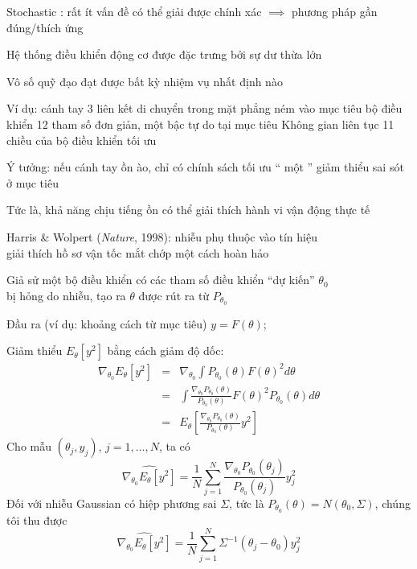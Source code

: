 \documentclass{article}
\begin{document}
\begin{huge}
Stochastic : rất ít vấn đề có thể giải được chính xác\al
$\implies$ phương pháp gần đúng/thích ứng





Hệ thống điều khiển động cơ được đặc trưng bởi sự dư thừa lớn

Vô số quỹ đạo đạt được bất kỳ nhiệm vụ nhất định nào

Ví dụ: cánh tay 3 liên kết di chuyển trong mặt phẳng ném vào mục tiêu\nl
  bộ điều khiển 12 tham số đơn giản, một bậc tự do tại mục tiêu\nl
  Không gian liên tục 11 chiều của bộ điều khiển tối ưu

Ý tưởng: nếu cánh tay ồn ào, chỉ có chính sách tối ưu `` một ''
giảm thiểu sai sót ở mục tiêu

Tức là, khả năng chịu tiếng ồn có thể giải thích hành vi vận động thực tế

Harris \& Wolpert ({\em Nature}, 1998): nhiễu phụ thuộc vào tín hiệu\\
giải thích hồ sơ vận tốc mắt chớp một cách hoàn hảo


Giả sử một bộ điều khiển có các tham số điều khiển ``dự kiến'' $\theta_0$\\
bị hỏng do nhiễu, tạo ra $\theta$ được rút ra từ $P_{\theta_0}$

Đầu ra (ví dụ: khoảng cách từ mục tiêu) $y = F(\theta)$; 


\maxfigwidth
{}



Giảm thiểu $E_{\theta}[y^2]$ bằng cách giảm độ dốc:
\begin{eqnarray*}
\nabla_{\theta_0} E_{\theta}[y^2]
  &=&  \nabla_{\theta_0} \int P_{\theta_0}(\theta)F(\theta)^2 d\theta \\
  &=&  \int \frac{\nabla_{\theta_0} P_{\theta_0}(\theta)}{P_{\theta_0}(\theta)}
            F(\theta)^2 P_{\theta_0}(\theta)d\theta \\
  &=&  E_{\theta}[\frac{\nabla_{\theta_0} P_{\theta_0}(\theta)}
                       {P_{\theta_0}(\theta)}
                  y^2]
\end{eqnarray*}
Cho mẫu $(\theta_j,y_j)$, $j=1,\ldots,N$, ta có
\[
  \hat{\nabla_{\theta_0} E_{\theta}[y^2]} =
  \frac{1}{N}\sum_{j=1}^N
     \frac{\nabla_{\theta_0} P_{\theta_0}(\theta_j)}
                       {P_{\theta_0}(\theta_j)}
                  y_j^2
\]
Đối với nhiễu Gaussian có hiệp phương sai $\Sigma$, tức là
$P_{\theta_0}(\theta) = N(\theta_0,\Sigma)$, chúng tôi thu được
\[
  \hat{\nabla_{\theta_0} E_{\theta}[y^2]} =
  \frac{1}{N}\sum_{j=1}^N \Sigma^{-1}(\theta_j - \theta_0) y_j^2
\]



\end{huge}
\end{document}
